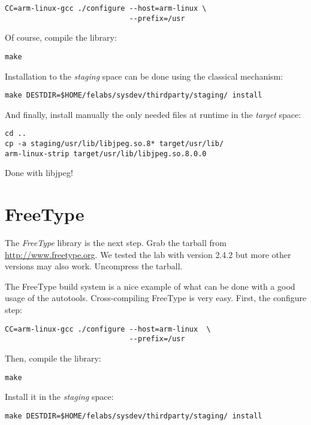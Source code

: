 \begin{verbatim}
CC=arm-linux-gcc ./configure --host=arm-linux \
                             --prefix=/usr
\end{verbatim}

Of course, compile the library:

\begin{verbatim}
make
\end{verbatim}

Installation to the {\em staging} space can be done using the
classical  mechanism:

\begin{verbatim}
make DESTDIR=$HOME/felabs/sysdev/thirdparty/staging/ install
\end{verbatim}

And finally, install manually the only needed files at runtime in the
{\em target} space:

\begin{verbatim}
cd ..
cp -a staging/usr/lib/libjpeg.so.8* target/usr/lib/
arm-linux-strip target/usr/lib/libjpeg.so.8.0.0
\end{verbatim}

Done with libjpeg!

\section{FreeType}

The {\em FreeType} library is the next step. Grab the tarball from
\url{http://www.freetype.org}. We tested the lab with version 2.4.2
but more other versions may also work. Uncompress the tarball.

The FreeType build system is a nice example of what can be done with a
good usage of the autotools. Cross-compiling FreeType is very
easy. First, the configure step:

\begin{verbatim}
CC=arm-linux-gcc ./configure --host=arm-linux  \
                             --prefix=/usr
\end{verbatim}

Then, compile the library:

\begin{verbatim}
make
\end{verbatim}

Install it in the {\em staging} space:

\begin{verbatim}
make DESTDIR=$HOME/felabs/sysdev/thirdparty/staging/ install
\end{verbatim}

